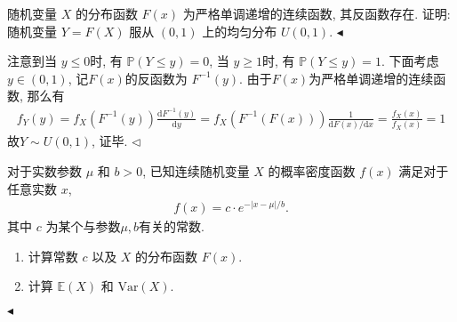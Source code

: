 \documentclass[11pt]{article}
\newenvironment{problem}[2][Problem]{\begin{trivlist}
    \item[\hskip \labelsep {\bfseries #1}\hskip \labelsep {\bfseries #2.}]\songti}{\hfill$\blacktriangleleft$\end{trivlist}}
\newenvironment{answer}[1][Solution]{\begin{trivlist}
    \item[\hskip \labelsep {\bfseries #1.}\hskip \labelsep]}{\hfill$\lhd$\end{trivlist}}
\newcommand\1{\mathds{1}}
\newcommand\E{\mathbb{E}}
\newcommand\PP{\mathbb{P}}
\newcommand\dd{\mathrm{d}}
\newcommand\Var{\mathrm{Var}}
\begin{document}
\begin{problem}{4}
    随机变量 $X$ 的分布函数 $F(x)$ 为严格单调递增的连续函数, 其反函数存在. 证明: 随机变量 $Y = F(X)$ 服从 $(0,1)$ 上的均匀分布 $U(0,1)$.
\end{problem}
\begin{answer}
    注意到当 $y\le 0$时, 有 $\PP(Y\le y) = 0$, 当 $y\ge 1$时, 有 $\PP(Y\le y) = 1$. 下面考虑$y\in (0,1)$, 记$F(x)$的反函数为 $F^{-1}(y)$. 由于$F(x)$为严格单调递增的连续函数, 那么有
    \begin{align*}
        f_{Y}(y) = f_X(F^{-1}(y)) \frac{\dd F^{-1}(y)}{\dd y} = f_X(F^{-1}(F(x)))\frac{1}{\dd F(x)/\dd x} = \frac{f_X(x)}{f_X(x)} = 1 
    \end{align*}
    故$Y\sim U(0,1)$, 证毕.
\end{answer}

\begin{problem}{5}
    对于实数参数 $\mu$ 和 $b >0$, 已知连续随机变量 $X$ 的概率密度函数 $f(x)$ 满足对于任意实数 $x$, 
    \begin{align*}
        f(x) = c\cdot e^{-|x-\mu|/b}.
    \end{align*}
    其中 $c$ 为某个与参数$\mu, b$有关的常数.
    \begin{enumerate}[label=(\arabic*)]
        \item 计算常数 $c$ 以及 $X$ 的分布函数 $F(x)$.
        \item 计算 $\E(X)$ 和 $\Var(X)$.
    \end{enumerate}
\end{problem}
\end{document}
